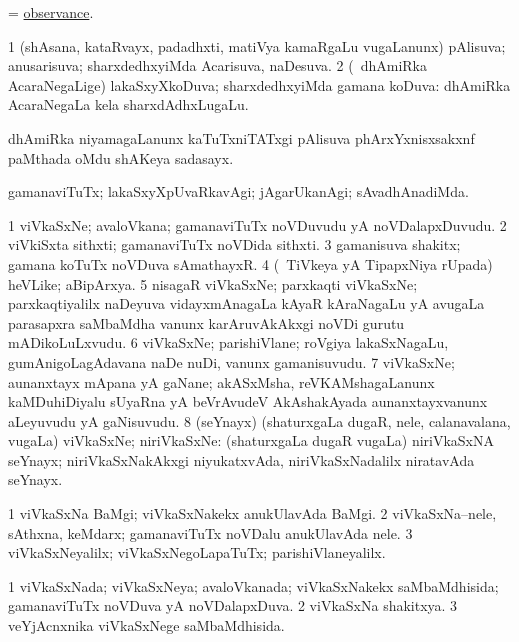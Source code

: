 \bentry
{}
\gl{\nA}
\bmng
= \hyperlink{observance}{observance}. 
\emng
\eentry

\bentry
{}
\gl{\gu}
\bmng
\bnum
\num{1} (shAsana, kataRvayx, padadhxti, matiVya kamaRgaLu \mo vugaLanunx) pAlisuva; anusarisuva; sharxdedhxyiMda Acarisuva, naDesuva. 
\num{2} (\kanmu\ dhAmiRka AcaraNegaLige) lakaSxyXkoDuva; sharxdedhxyiMda gamana koDuva:  dhAmiRka AcaraNegaLa kela sharxdAdhxLugaLu. 
\enum
\emng
\eentry

\bentry
{}
\gl{\nA}
\bmng
dhAmiRka niyamagaLanunx kaTuTxniTATxgi pAlisuva phArxYxnisxsakxnf paMthada oMdu shAKeya sadasayx. 
\emng
\eentry

\bentry
{}
\gl{\kirxvi}
\bmng
gamanaviTuTx; lakaSxyXpUvaRkavAgi; jAgarUkanAgi; sAvadhAnadiMda. 
\emng
\eentry

\bentry
{}
\gl{\nA}
\bmng
\bnum
\num{1} viVkaSxNe; avaloVkana; gamanaviTuTx noVDuvudu yA noVDalapxDuvudu. 
\num{2} viVkiSxta sithxti; gamanaviTuTx noVDida sithxti. 
\num{3} gamanisuva shakitx; gamana koTuTx noVDuva sAmathayxR. 
\num{4} (\kanmu\ TiVkeya yA TipapxNiya rUpada) heVLike; aBipArxya. 
\num{5} nisagaR viVkaSxNe; parxkaqti viVkaSxNe; parxkaqtiyalilx naDeyuva vidayxmAnagaLa kAyaR kAraNagaLu yA avugaLa parasapxra saMbaMdha \mo vanunx karAruvAkAkxgi noVDi gurutu mADikoLuLxvudu. 
\num{6} viVkaSxNe; parishiVlane; roVgiya lakaSxNagaLu, gumAnigoLagAdavana naDe nuDi, \mo vanunx gamanisuvudu. 
\num{7} viVkaSxNe; aunanxtayx mApana yA gaNane; akASxMsha, reVKAMshagaLanunx kaMDuhiDiyalu sUyaRna yA beVrAvudeV AkAshakAyada aunanxtayxvanunx aLeyuvudu yA gaNisuvudu. 
\num{8} (seYnayx) (shaturxgaLa dugaR, nele, calanavalana, \mo vugaLa) viVkaSxNe; niriVkaSxNe:  (shaturxgaLa dugaR \mo vugaLa) niriVkaSxNA seYnayx; niriVkaSxNakAkxgi niyukatxvAda, niriVkaSxNadalilx niratavAda seYnayx. 
\enum
\emng

\noindent
\gl{\pagu}
\bmng
\bnum
\num{1}  viVkaSxNa BaMgi; viVkaSxNakekx anukUlavAda BaMgi. 
\num{2}  viVkaSxNa--nele, sAthxna, keMdarx; gamanaviTuTx noVDalu anukUlavAda nele. 
\num{3}  viVkaSxNeyalilx; viVkaSxNegoLapaTuTx; parishiVlaneyalilx. 
\enum
\emng
\eentry

\bentry
{}
\gl{\gu}
\bmng
\bnum
\num{1} viVkaSxNada; viVkaSxNeya; avaloVkanada; viVkaSxNakekx saMbaMdhisida; gamanaviTuTx noVDuva yA noVDalapxDuva. 
\num{2} viVkaSxNa shakitxya. 
\num{3} veYjAcnxnika viVkaSxNege saMbaMdhisida. 
\enum
\emng
\eentry

